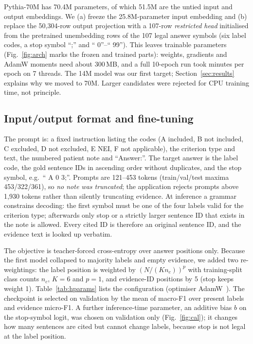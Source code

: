 Pythia-70M has 70.4M parameters, of which 51.5M are the untied input and output embeddings. We (a) freeze the 25.8M-parameter input embedding and (b) replace the 50,304-row output projection with a 107-row \emph{restricted head} initialised from the pretrained unembedding rows of the 107 legal answer symbols (six label codes, a stop symbol ``;'' and `` 0''--`` 99''). This leaves \TrainParams{} trainable parameters (Fig.~\ref{fig:arch} marks the frozen and trained parts): weights, gradients and AdamW moments need about 300\,MB, and a full 10-epoch run took \EpochMinutes{} minutes per epoch on 7 threads. The 14M model was our first target; Section~\ref{sec:results} explains why we moved to 70M. Larger candidates were rejected for CPU training time, not principle.

\subsection{Input/output format and fine-tuning}
The prompt is: a fixed instruction listing the codes (A included, B not included, C excluded, D not excluded, E NEI, F not applicable), the criterion type and text, the numbered patient note and ``Answer:''. The target answer is the label code, the gold sentence IDs in ascending order without duplicates, and the stop symbol, e.g.\ `` A 0 3;''. Prompts are 121--453 tokens (train/val/test maxima 453/322/361), so \emph{no note was truncated}; the application rejects prompts above 1,930 tokens rather than silently truncating evidence. At inference a grammar constrains decoding: the first symbol must be one of the four labels valid for the criterion type; afterwards only stop or a strictly larger sentence ID that exists in the note is allowed. Every cited ID is therefore an original sentence ID, and the evidence text is looked up verbatim.

The objective is teacher-forced cross-entropy over answer positions only. Because the first model collapsed to majority labels and empty evidence, we added two re-weightings: the label position is weighted by $(N/(K n_c))^{p}$ with training-split class counts $n_c$, $K{=}6$ and $p{=}1$, and evidence-ID positions by 5 (stop keeps weight 1). Table~\ref{tab:hparams} lists the configuration (optimiser AdamW~\cite{adamw}). The checkpoint is selected on validation by the mean of macro-F1 over present labels and evidence micro-F1. A further inference-time parameter, an additive bias $b$ on the stop-symbol logit, was chosen on validation only (Fig.~\ref{fig:cal}); it changes how many sentences are cited but cannot change labels, because stop is not legal at the label position.

